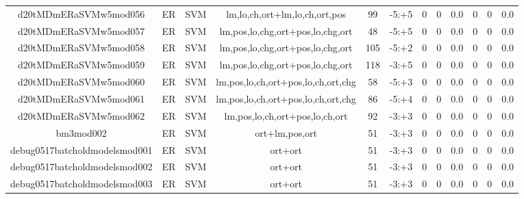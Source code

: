 \documentclass[a4paper]{article}
\begin{document}
\begin{landscape}
\begin{center}
\begin{tabular}{ |c|c|c|c|c|c|c|c|c|c|c|c|}
 
 	
 	\small{ d20tMDmERaSVMw5mod056 } & ER & SVM & lm,lo,ch,ort+lm,lo,ch,ort,pos  &  99 &  -5:+5  &  0 & 0 & 0.0  &  0 & 0 & 0.0 \\
 	

 
 	
 	\small{ d20tMDmERaSVMw5mod057 } & ER & SVM & lm,pos,lo,chg,ort+pos,lo,chg,ort  &  48 &  -5:+5  &  0 & 0 & 0.0  &  0 & 0 & 0.0 \\
 	

 
 	
 	\small{ d20tMDmERaSVMw5mod058 } & ER & SVM & lm,pos,lo,chg,ort+pos,lo,chg,ort  &  105 &  -5:+2  &  0 & 0 & 0.0  &  0 & 0 & 0.0 \\
 	

 
 	
 	\small{ d20tMDmERaSVMw5mod059 } & ER & SVM & lm,pos,lo,chg,ort+pos,lo,chg,ort  &  118 &  -3:+5  &  0 & 0 & 0.0  &  0 & 0 & 0.0 \\
 	

 
 	
 	\small{ d20tMDmERaSVMw5mod060 } & ER & SVM & lm,pos,lo,ch,ort+pos,lo,ch,ort,chg  &  58 &  -5:+3  &  0 & 0 & 0.0  &  0 & 0 & 0.0 \\
 	

 
 	
 	\small{ d20tMDmERaSVMw5mod061 } & ER & SVM & lm,pos,lo,ch,ort+pos,lo,ch,ort,chg  &  86 &  -5:+4  &  0 & 0 & 0.0  &  0 & 0 & 0.0 \\
 	

 
 	
 	\small{ d20tMDmERaSVMw5mod062 } & ER & SVM & lm,pos,lo,ch,ort+pos,lo,ch,ort  &  92 &  -3:+3  &  0 & 0 & 0.0  &  0 & 0 & 0.0 \\
 	

 
 	
 	\small{ bm3mod002 } & ER & SVM & ort+lm,pos,ort  &  51 &  -3:+3  &  0 & 0 & 0.0  &  0 & 0 & 0.0 \\
 	

 
 	
 	\small{ debug0517batcholdmodelsmod001 } & ER & SVM & ort+ort  &  51 &  -3:+3  &  0 & 0 & 0.0  &  0 & 0 & 0.0 \\
 	

 
 	
 	\small{ debug0517batcholdmodelsmod002 } & ER & SVM & ort+ort  &  51 &  -3:+3  &  0 & 0 & 0.0  &  0 & 0 & 0.0 \\
 	

 
 	
 	\small{ debug0517batcholdmodelsmod003 } & ER & SVM & ort+ort  &  51 &  -3:+3  &  0 & 0 & 0.0  &  0 & 0 & 0.0 \\
 	


\end{tabular}
\end{center}
\end{landscape}
\end{document}
